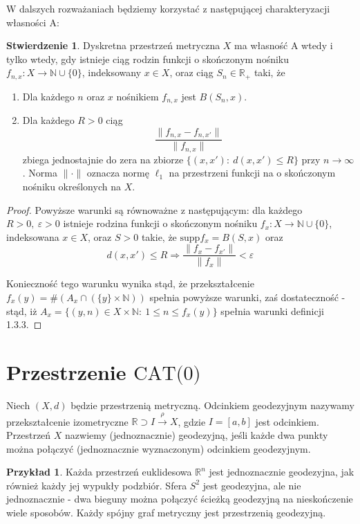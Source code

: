 \documentclass[licencjacka]{pracamgr}
\theoremstyle{definition}
\theoremstyle{definition}
\theoremstyle{definition}
\newtheorem{proposition}{Stwierdzenie}[section]
\theoremstyle{definition}
\newtheorem{example}{Przykład}[section]
\theoremstyle{definition}
\theoremstyle{plain}
\theoremstyle{plain}
\begin{document}
W dalszych rozważaniach będziemy korzystać z następującej charakteryzacji własności A:

\begin{proposition}
	Dyskretna przestrzeń metryczna $ X $ ma własność A wtedy i tylko wtedy, gdy 
	istnieje ciąg rodzin funkcji o skończonym nośniku $ f_{n,x} : X \rightarrow \mathbb{N}
	\cup \{0\} $, indeksowany $ x \in X $, oraz ciąg $ S_n \in \mathbb{R}_{+} $ taki, że
	\begin{enumerate}
		\item Dla każdego $ n $ oraz $ x $ nośnikiem $ f_{n,x} $ jest $ B(S_n, x) $.
		\item Dla każdego $ R > 0 $ ciąg $$ \frac{\| f_{n,x} - f_{n,x'} \|}{\| f_{n,x} \|} $$
		zbiega jednostajnie do zera na zbiorze $ \{ (x,x'): ~ d(x,x') \leq R\} $ przy 
		$ n \rightarrow \infty $. Norma $ \| \cdot \| $ oznacza normę $ \ell_1 $ na 
		przestrzeni funkcji na o skończonym nośniku określonych na $ X $.
	\end{enumerate}
\end{proposition}
\begin{proof}
	Powyższe warunki są równoważne z następującym: dla każdego $ R>0, ~ \varepsilon > 0 $ 
	istnieje rodzina funkcji o skończonym nośniku $ f_x : X \rightarrow \mathbb{N} \cup 
	\{0\}$, indeksowana $ x \in X $, oraz $ S > 0 $ takie, że $ \text{supp}{f_x} = B(S,x)  $ 
	oraz $$ d(x,x') \leq R \Rightarrow \frac{\| f_x - f_{x'} \|}{\|f_x \|} < \varepsilon $$

	Konieczność tego warunku wynika stąd, że przekształcenie $ f_x(y) = \#\left( A_x \cap \left( 
	\{y\} \times \mathbb{N} \right) \right) $ spełnia powyższe warunki, zaś dostateczność - 
	stąd, iż $ A_x = \{(y,n) \in X \times \mathbb{N} : ~ 1 \leq n \leq f_x(y) \} $ spełnia 
	warunki definicji 1.3.3.
\end{proof}



\section{Przestrzenie $\text{CAT(0)}$}
Niech $ (X, d) $ będzie przestrzenią metryczną. Odcinkiem geodezyjnym nazywamy 
przekształcenie izometryczne $ \mathbb{R} \supset I \xrightarrow{\rho} X $, gdzie 
$ I =[a,b]$ jest odcinkiem. Przestrzeń $ X $ nazwiemy (jednoznacznie) geodezyjną, 
jeśli każde dwa punkty można połączyć (jednoznacznie wyznaczonym) odcinkiem 
geodezyjnym.

\begin{example}
	Każda przestrzeń euklidesowa $ \mathbb{R}^n $ jest jednoznacznie geodezyjna, 
	jak również każdy jej wypukły podzbiór. Sfera $ S^2 $ jest geodezyjna, ale 
	nie jednoznacznie - dwa bieguny można połączyć ścieżką geodezyjną na 
	nieskończenie wiele sposobów. Każdy spójny graf metryczny jest przestrzenią 
	geodezyjną.
\end{example}
\end{document}
